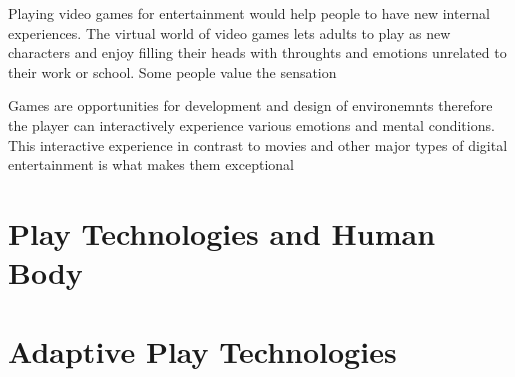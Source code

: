 Playing video games for entertainment would help people to have new internal experiences. 
The virtual world of video games lets adults to play as new characters and enjoy filling 
their heads with throughts and emotions unrelated to their work or school. Some people value 
the sensation

Games are opportunities for development and design of environemnts therefore 
the player can interactively experience various emotions and mental conditions.
This interactive experience in contrast to movies 
and other major types of digital entertainment is what makes them exceptional

\section{Play Technologies and Human Body}

\section{Adaptive Play Technologies}
